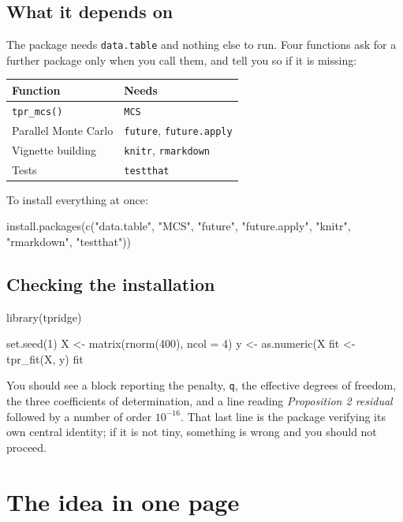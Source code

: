\documentclass[11pt,a4paper]{report}
\begin{document}
\section{What it depends on}

The package needs \texttt{data.table} and nothing else to run. Four
functions ask for a further package only when you call them, and tell
you so if it is missing:

\begin{center}
\begin{tabular}{ll}
\toprule
Function & Needs \\
\midrule
\texttt{tpr\_mcs()} & \texttt{MCS} \\
Parallel Monte Carlo & \texttt{future}, \texttt{future.apply} \\
Vignette building & \texttt{knitr}, \texttt{rmarkdown} \\
Tests & \texttt{testthat} \\
\bottomrule
\end{tabular}
\end{center}

To install everything at once:

\begin{Rblock}
install.packages(c("data.table", "MCS", "future", "future.apply",
                   "knitr", "rmarkdown", "testthat"))
\end{Rblock}

\section{Checking the installation}

\begin{Rblock}
library(tpridge)

set.seed(1)
X <- matrix(rnorm(400), ncol = 4)
y <- as.numeric(X %
fit <- tpr_fit(X, y)
fit
\end{Rblock}

You should see a block reporting the penalty, \texttt{q}, the effective
degrees of freedom, the three coefficients of determination, and a line
reading \emph{Proposition 2 residual} followed by a number of order
$10^{-16}$. That last line is the package verifying its own central
identity; if it is not tiny, something is wrong and you should not
proceed.

\chapter{The idea in one page}
\end{document}
